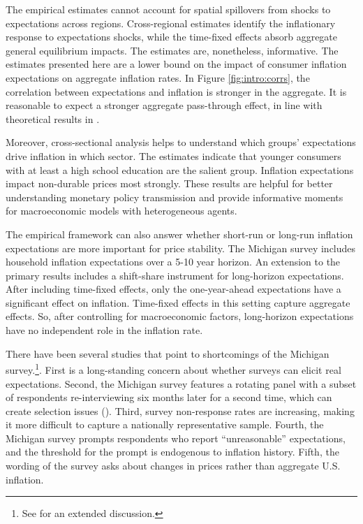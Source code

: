 \documentclass[12pt]{article}
\begin{document}
The empirical estimates cannot account for spatial spillovers from shocks to expectations across regions. Cross-regional estimates identify the inflationary response to expectations shocks, while the time-fixed effects absorb aggregate general equilibrium impacts. The estimates are, nonetheless, informative. The estimates presented here are a lower bound on the impact of consumer inflation expectations on aggregate inflation rates. In Figure \ref{fig:intro:corrs}, the correlation between expectations and inflation is stronger in the aggregate. It is reasonable to expect a stronger aggregate pass-through effect, in line with theoretical results in \cite{Werning:expectsWP}.

Moreover, cross-sectional analysis helps to understand which groups' expectations drive inflation in which sector. The estimates indicate that younger consumers with at least a high school education are the salient group. Inflation expectations impact non-durable prices most strongly. These results are helpful for better understanding monetary policy transmission and provide informative moments for macroeconomic models with heterogeneous agents.

The empirical framework can also answer whether short-run or long-run inflation expectations are more important for price stability. The Michigan survey includes household inflation expectations over a 5-10 year horizon. An extension to the primary results includes a shift-share instrument for long-horizon expectations. After including time-fixed effects, only the one-year-ahead expectations have a significant effect on inflation. Time-fixed effects in this setting capture aggregate effects. So, after controlling for macroeconomic factors, long-horizon expectations have no independent role in the inflation rate.

There have been several studies that point to shortcomings of the Michigan survey.\footnote{See \cite{JELexpects} for an extended discussion.}. First is a long-standing concern about whether surveys can elicit real expectations. Second, the Michigan survey features a rotating panel with a subset of respondents re-interviewing six months later for a second time, which can create selection issues (\cite{BinderKim:AEJM2021}). Third, survey non-response rates are increasing, making it more difficult to capture a nationally representative sample. Fourth, the Michigan survey prompts respondents who report ``unreasonable'' expectations, and the threshold for the prompt is endogenous to inflation history. Fifth, the wording of the survey asks about changes in prices rather than aggregate U.S. inflation.
\end{document}
